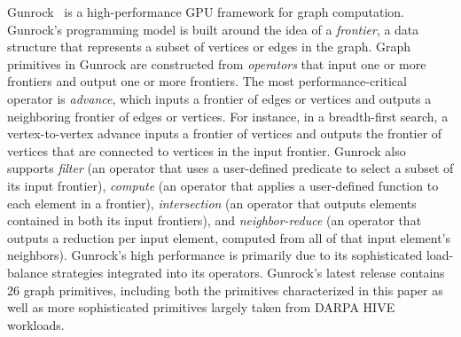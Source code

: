 \label{sec:gunrock}

Gunrock~\cite{wang2017gunrock} is a high-performance GPU framework for graph computation. Gunrock's programming model is built around the idea of a \emph{frontier}, a data structure that represents a subset of vertices or edges in the graph. Graph primitives in Gunrock are constructed from \emph{operators} that input one or more frontiers and output one or more frontiers. The most performance-critical operator is \emph{advance}, which inputs a frontier of edges or vertices and outputs a neighboring frontier of edges or vertices. For instance, in a breadth-first search, a vertex-to-vertex advance inputs a frontier of vertices and outputs the frontier of vertices that are connected to vertices in the input frontier. Gunrock also supports \emph{filter} (an operator that uses a user-defined predicate to select a subset of its input frontier), \emph{compute} (an operator that applies a user-defined function to each element in a frontier), \emph{intersection} (an operator that outputs elements contained in both its input frontiers), and \emph{neighbor-reduce} (an operator that outputs a reduction per input element, computed from all of that input element's neighbors). Gunrock's high performance is primarily due to its sophisticated load-balance strategies integrated into its operators. Gunrock's latest release contains 26 graph primitives, including both the primitives characterized in this paper as well as more sophisticated primitives largely taken from DARPA HIVE workloads.
